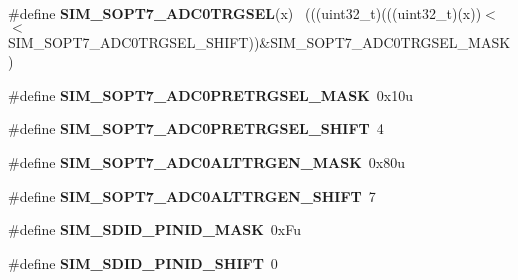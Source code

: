 \begin{DoxyCompactItemize}
\item 
\hypertarget{group___s_i_m___register___masks_ga3688192d4b3dce98ac9b670242a38b23}{}\#define {\bfseries S\+I\+M\+\_\+\+S\+O\+P\+T7\+\_\+\+A\+D\+C0\+T\+R\+G\+S\+E\+L}(x)                                ~(((uint32\+\_\+t)(((uint32\+\_\+t)(x))$<$$<$S\+I\+M\+\_\+\+S\+O\+P\+T7\+\_\+\+A\+D\+C0\+T\+R\+G\+S\+E\+L\+\_\+\+S\+H\+I\+F\+T))\&S\+I\+M\+\_\+\+S\+O\+P\+T7\+\_\+\+A\+D\+C0\+T\+R\+G\+S\+E\+L\+\_\+\+M\+A\+S\+K)\label{group___s_i_m___register___masks_ga3688192d4b3dce98ac9b670242a38b23}

\item 
\hypertarget{group___s_i_m___register___masks_ga74544c6c9d4fbc593884681ac79c796f}{}\#define {\bfseries S\+I\+M\+\_\+\+S\+O\+P\+T7\+\_\+\+A\+D\+C0\+P\+R\+E\+T\+R\+G\+S\+E\+L\+\_\+\+M\+A\+S\+K}~0x10u\label{group___s_i_m___register___masks_ga74544c6c9d4fbc593884681ac79c796f}

\item 
\hypertarget{group___s_i_m___register___masks_gaee870f942318f14376ee9e6d5558e2ff}{}\#define {\bfseries S\+I\+M\+\_\+\+S\+O\+P\+T7\+\_\+\+A\+D\+C0\+P\+R\+E\+T\+R\+G\+S\+E\+L\+\_\+\+S\+H\+I\+F\+T}~4\label{group___s_i_m___register___masks_gaee870f942318f14376ee9e6d5558e2ff}

\item 
\hypertarget{group___s_i_m___register___masks_ga6390cd75db35ecc6c5fc6d5b0d417a7d}{}\#define {\bfseries S\+I\+M\+\_\+\+S\+O\+P\+T7\+\_\+\+A\+D\+C0\+A\+L\+T\+T\+R\+G\+E\+N\+\_\+\+M\+A\+S\+K}~0x80u\label{group___s_i_m___register___masks_ga6390cd75db35ecc6c5fc6d5b0d417a7d}

\item 
\hypertarget{group___s_i_m___register___masks_gaa20ed5f5ab9cf02714a993c3996adcc5}{}\#define {\bfseries S\+I\+M\+\_\+\+S\+O\+P\+T7\+\_\+\+A\+D\+C0\+A\+L\+T\+T\+R\+G\+E\+N\+\_\+\+S\+H\+I\+F\+T}~7\label{group___s_i_m___register___masks_gaa20ed5f5ab9cf02714a993c3996adcc5}

\item 
\hypertarget{group___s_i_m___register___masks_gaf0820acb74ce8270da2025fee624b47c}{}\#define {\bfseries S\+I\+M\+\_\+\+S\+D\+I\+D\+\_\+\+P\+I\+N\+I\+D\+\_\+\+M\+A\+S\+K}~0x\+Fu\label{group___s_i_m___register___masks_gaf0820acb74ce8270da2025fee624b47c}

\item 
\hypertarget{group___s_i_m___register___masks_ga593faac0d0629fde52f6fe4b83614c23}{}\#define {\bfseries S\+I\+M\+\_\+\+S\+D\+I\+D\+\_\+\+P\+I\+N\+I\+D\+\_\+\+S\+H\+I\+F\+T}~0\label{group___s_i_m___register___masks_ga593faac0d0629fde52f6fe4b83614c23}


\end{DoxyCompactItemize}
